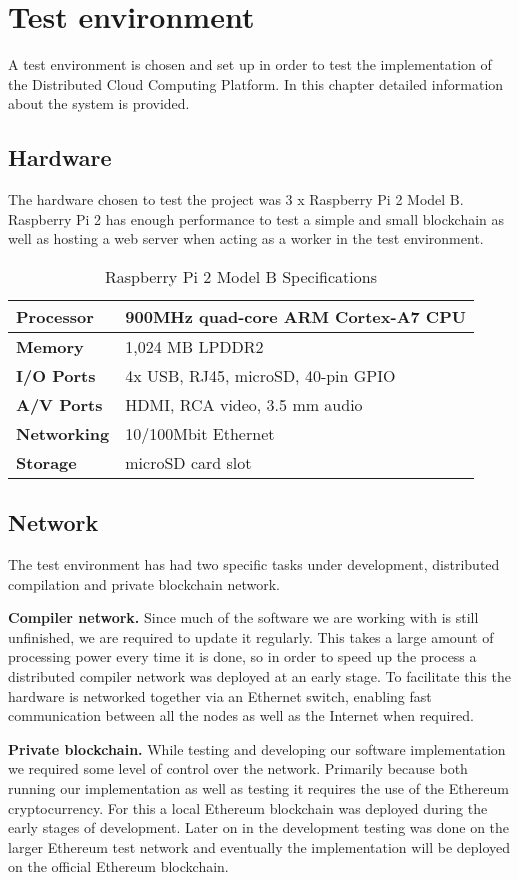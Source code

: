 \section{Test environment}
A test environment is chosen and set up in order to test the implementation of the Distributed Cloud Computing Platform. In this chapter detailed information about the system is provided.

\subsection{Hardware}
The hardware chosen to test the project was 3 x Raspberry Pi 2 Model B. Raspberry Pi 2 has enough performance to test a simple and small blockchain as well as hosting a web server when acting as a worker in the test environment. 

\begin{table}[h]
\centering
\caption{Raspberry Pi 2 Model B Specifications\cite{rpi}}
\begin{tabular}{|l|l|}
\hline \textbf{Processor} & 900MHz quad-core ARM Cortex-A7 CPU \\ \hline
\textbf{Memory} & 1,024 MB LPDDR2 \\ \hline 
\textbf{I/O Ports} & 4x USB, RJ45, microSD, 40-pin GPIO \\ \hline
\textbf{A/V Ports} & HDMI, RCA video, 3.5 mm audio \\ \hline
\textbf{Networking} & 10/100Mbit Ethernet \\ \hline
\textbf{Storage} & microSD card slot \\ \hline
\end{tabular}
\end{table}

\subsection{Network}
The test environment has had two specific tasks under development, distributed compilation and private blockchain network.

\textbf{Compiler network.} Since much of the software we are working with is still unfinished, we are required to update it regularly. This takes a large amount of processing power every time it is done, so in order to speed up the process a distributed compiler network was deployed at an early stage. To facilitate this the hardware is networked together via an Ethernet switch, enabling fast communication between all the nodes as well as the Internet when required. 

\textbf{Private blockchain.} While testing and developing our software implementation we required some level of control over the network. Primarily because both running our implementation as well as testing it requires the use of the Ethereum cryptocurrency. For this a local Ethereum blockchain was deployed during the early stages of development. Later on in the development testing was done on the larger Ethereum test network and eventually the implementation will be deployed on the official Ethereum blockchain.

